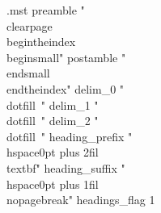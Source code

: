 \makenoidxglossaries

\renewcommand*{\indexpagestyle}{scrplain}
\makeindex

\makeatletter
\newcommand*{\glsplainhyperlink}[2]{%
  \colorlet{currenttext}{.}%
  \colorlet{currentlink}{\@linkcolor}%
  \hypersetup{linkcolor=currenttext}%
  \hyperlink{#1}{#2}%
  \hypersetup{linkcolor=currentlink}%
}
\let\@glslink\glsplainhyperlink
\makeatother

\usepackage{filecontents}
\begin{filecontents}{\jobname .mst}
%
preamble  "\\clearpage\\begin{theindex}\\begin{small}\n"
postamble "\n\n\\end{small}\\end{theindex}\n"
%
delim_0 "~\\dotfill~"
delim_1 "~\\dotfill~"
delim_2 "~\\dotfill~"
%
heading_prefix "{\\hspace{0pt plus 2fil}\\textbf{"
heading_suffix "}\\hspace{0pt plus 1fil}}\\nopagebreak\n"
headings_flag  1
\end{filecontents}

